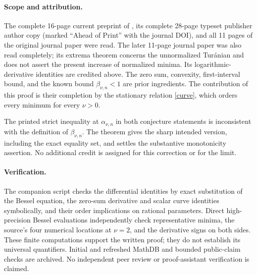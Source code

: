 \documentclass[11pt]{article}
\begin{document}
\newpage
\paragraph{Scope and attribution.}
The complete 16-page current preprint of \cite{BP}, its complete 28-page
typeset publisher author copy (marked ``Ahead of Print'' with the journal
DOI), and all 11 pages of the original journal paper \cite{B} were read.
The later 11-page journal paper \cite{BPS} was also read completely; its
extrema theorem concerns the unnormalized Tur\'anian and does not assert
the present increase of normalized minima. Its logarithmic-derivative
identities are credited above. The zero sum, convexity, first-interval
bound, and the known bound $\beta_{\nu,n}<1$ are prior ingredients.
The contribution of this proof is their completion by the stationary
relation \eqref{curve}, which orders every minimum for every $\nu>0$.

The printed strict inequality at $\alpha_{\nu,n}$ in both conjecture
statements is inconsistent with the definition of $\beta_{\nu,n}$.
The theorem gives the sharp intended version, including the exact
equality set, and settles the substantive monotonicity assertion.
No additional credit is assigned for this correction or for the limit.

\paragraph{Verification.}
The companion script checks the differential identities by exact
substitution of the Bessel equation, the zero-sum derivative and scalar
curve identities symbolically, and their order implications on rational
parameters. Direct high-precision Bessel evaluations independently check
representative minima, the source's four numerical locations at $\nu=2$,
and the derivative signs on both sides. These finite computations support
the written proof; they do not establish its universal quantifiers.
Initial and refreshed MathDB and bounded public-claim checks are archived.
No independent peer review or proof-assistant verification is claimed.
\end{document}
